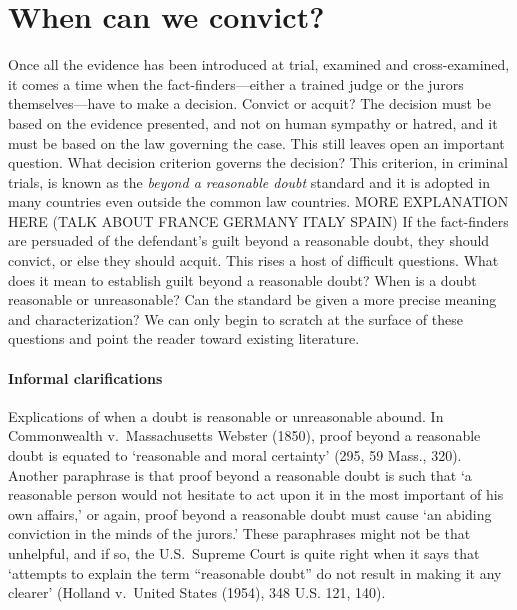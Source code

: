 \documentclass[10pt]{article}
\begin{document}
\section{When can we convict?}
\label{sec:whenconv}



Once all the evidence has been introduced at trial, examined and cross-examined, it comes a time when the fact-finders---either a trained judge or the jurors themselves---have 
to make a decision. Convict or acquit? The decision must be based on the evidence presented, and not on human sympathy or hatred, and it must be based 
on the law governing the case. This still leaves open an important question. What decision criterion governs the decision? This criterion, in criminal trials, is known as the \textit{beyond a reasonable doubt} standard and it is adopted in many countries even outside the common law countries. MORE EXPLANATION HERE (TALK ABOUT FRANCE GERMANY ITALY SPAIN) 
If the fact-finders are persuaded of the defendant's guilt beyond a reasonable doubt, they should convict, or else they should acquit. This rises a host of difficult questions. What does  it mean to establish guilt beyond a reasonable doubt? When is a doubt reasonable or unreasonable? Can the standard be given a more precise meaning and characterization? We can only begin to scratch at the surface of these questions and point the reader toward existing literature. 
  
  \paragraph{Informal clarifications}
  Explications of when a doubt is reasonable or unreasonable abound. In Commonwealth v.\ Massachusetts Webster (1850), 
proof beyond a reasonable doubt is equated to `reasonable and moral certainty' (295, 59 Mass., 320).  Another paraphrase is that proof beyond a reasonable doubt is such that `a reasonable person would not hesitate to act upon it in the most important of his own affairs,' or again, proof beyond a reasonable doubt must cause `an abiding conviction in the minds of the jurors.' These paraphrases might not be that unhelpful, and if so, the U.S.\ Supreme Court is quite right when it says that `attempts to explain the term ``reasonable doubt'' do not result in making it any clearer' (Holland v.\ United States (1954), 348 U.S. 121, 140). 
\end{document}
